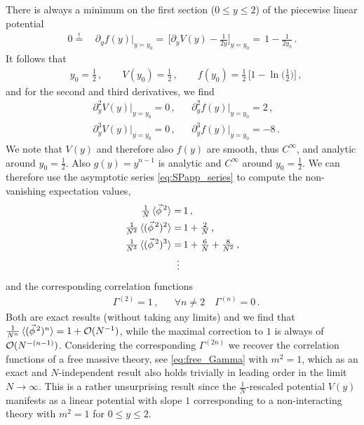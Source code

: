 There is always a minimum on the first section (${0 \leq y \leq 2}$) of the piecewise linear potential
\begin{align}
	0 \overset{!}{=} \, & \partial_y f(y) \big|_{y = y_0} =	\, \bigg[ \partial_y V ( y ) - \frac{1}{2 y} \bigg]_{y = y_0} =\, 1 - \frac{1}{2 y_0} \, .
\end{align}
It follows that
\begin{align}
	&	y_0 = \tfrac{1}{2} \, ,	\qquad	V ( y_0 ) = \tfrac{1}{2} \, ,	\qquad	f ( y_0 ) = \tfrac{1}{2} \, \big[ 1 - \ln \big( \tfrac{1}{2} \big) \big] \, ,
\end{align}
and for the second and third derivatives, we find
\begin{align}
	&	\partial_y^2 V ( y ) \big|_{y = y_0} = 0 \, ,	&&	\partial_y^2 f ( y ) \big|_{y = y_0} = 2 \, ,\\[.2em]
	&	\partial_y^3 V ( y ) \big|_{y = y_0} = 0 \, ,	&&	\partial_y^3 f ( y ) \big|_{y = y_0} = - 8 \, .	
\end{align}
We note that $V ( y )$ and therefore also $f ( y )$ are smooth, thus $C^\infty$, and analytic around $y_0 = \tfrac{1}{2}$. Also $g ( y ) = y^{n - 1}$ is analytic and $C^\infty$ around $y_0 = \tfrac{1}{2}$. We can therefore use the asymptotic series \eqref{eq:SPapp_series} to compute the non-vanishing expectation values,
\begin{subequations}
\begin{align}
	\tfrac{1}{N} \, \langle \vec{\phi}^{\, 2}  \rangle = \, & 1 \, ,\\
	\tfrac{1}{N^2} \, \langle ( \vec{\phi}^{\, 2} )^2 \rangle = \, & 1 + \tfrac{2}{N} \, ,\\
	\tfrac{1}{N^3} \, \langle ( \vec{\phi}^{\, 2} )^3 \rangle = \, & 1 + \tfrac{6}{N} + \tfrac{8}{N^2} \, ,\\* %
	\vdots \mkern7.0mu  & \nonumber
\end{align}
\end{subequations}
and the corresponding \ipi{} correlation functions
\begin{align}
	&	\Gamma^{(2)} = 1 \, ,	&&	\forall n \neq 2 \quad \Gamma^{(n)} = 0 \, .
\end{align}
Both are exact results (without taking any limits) and we find that $\tfrac{1}{N^n} \, \langle ( \vec{\phi}^{\, 2} )^n \rangle = 1 + \mathcal{O} ( N^{- 1} )$, while the maximal correction to $1$ is always of $\mathcal{O} ( N^{- ( n - 1 )})$.
Considering the corresponding $\Gamma^{(2n)}$ we recover the \ipi{} correlation functions of a free massive theory, see \cref{eq:free_Gamma} with $m^2 = 1$, which \dash{} as an exact and $N$-independent result \dash{} also holds trivially in leading order in the limit ${N \rightarrow \infty}$.
This is a rather unsurprising result since the $\tfrac{1}{N}$-rescaled potential $V ( y )$ manifests as a linear potential with slope $1$ \dash{} corresponding to a non-interacting theory with $m^2 = 1$ \dash{} for ${0 \leq y \leq 2}$.\bigskip

